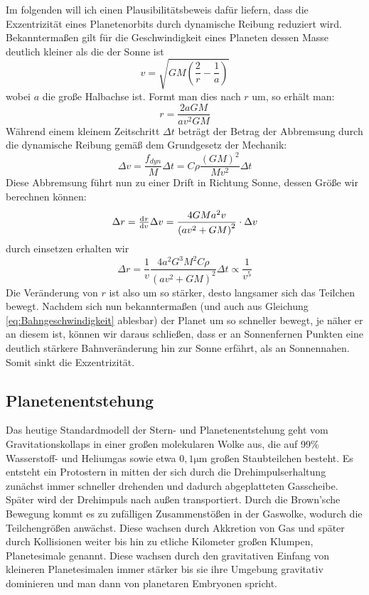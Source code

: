 \documentclass[12pt,a4paper,twoside]{article}
\begin{document}
Im folgenden will ich einen Plausibilitätsbeweis dafür liefern, dass die Exzentrizität eines Planetenorbits durch dynamische Reibung reduziert wird.
Bekanntermaßen gilt für die Geschwindigkeit eines Planeten dessen Masse deutlich kleiner als die der Sonne ist
\begin{equation}\label{eq:Bahngeschwindigkeit}
v= \sqrt{GM\left(\frac{2}{r}-\frac{1}{a}\right)}
\end{equation}
wobei $a$ die große Halbachse ist. Formt man dies nach $r$ um, so erhält man:
\begin{equation}
r = \frac{2aGM}{av^2GM}
\end{equation}
Während einem kleinem Zeitschritt $\Delta t$ beträgt der Betrag der Abbremsung durch die dynamische Reibung gemäß dem Grundgesetz der Mechanik:
\begin{equation}
\Delta v = \frac{f_{dyn}}{M} \Delta t = C \rho \frac{\left(GM\right)^2}{Mv^2} \Delta t
\end{equation}
Diese Abbremsung führt nun zu einer Drift in Richtung Sonne, dessen Größe wir berechnen können:
\begin{equation}
\Delta r = \od{r}{v}\Delta v = \frac{4GMa^2v}{\left(av^2+GM\right)^2} \cdot \Delta v
\end{equation}
durch einsetzen erhalten wir
\begin{equation}
\Delta r = \frac{1}{v} \frac{4a^2G^3M^2 C \rho}{\left(av^2+GM\right)^2}  \Delta t \propto \frac{1}{v^5}
\end{equation} %
Die Veränderung von $r$ ist also um so stärker, desto langsamer sich das Teilchen bewegt. Nachdem sich nun bekanntermaßen (und auch aus Gleichung \ref{eq:Bahngeschwindigkeit} ablesbar) der Planet um so schneller bewegt, je näher er an diesem ist, können wir daraus schließen, dass er an Sonnenfernen Punkten eine deutlich stärkere Bahnveränderung hin zur Sonne erfährt, als an Sonnennahen. Somit sinkt die Exzentrizität.

\subsection{Planetenentstehung} %
Das heutige Standardmodell der Stern- und Planetenentstehung geht vom Gravitationskollaps in einer großen molekularen Wolke aus, die auf 99\% Wasserstoff- und Heliumgas sowie etwa $0,1\mathrm{\mu m}$ großen Staubteilchen besteht\cite{Hanslmeier2002}. Es entsteht ein Protostern in mitten der sich durch die Drehimpulserhaltung zunächst immer schneller drehenden und dadurch abgeplatteten Gasscheibe.
Später wird der Drehimpuls nach außen transportiert. %
Durch die Brown'sche Bewegung kommt es zu zufälligen Zusammenstößen in der Gaswolke, wodurch die Teilchengrößen anwächst. Diese wachsen durch Akkretion von Gas und später durch Kollisionen weiter bis hin zu etliche Kilometer großen Klumpen, Planetesimale genannt.
Diese wachsen durch den gravitativen Einfang von kleineren Planetesimalen immer stärker bis sie ihre Umgebung gravitativ dominieren und man dann von planetaren Embryonen spricht.
\end{document}
